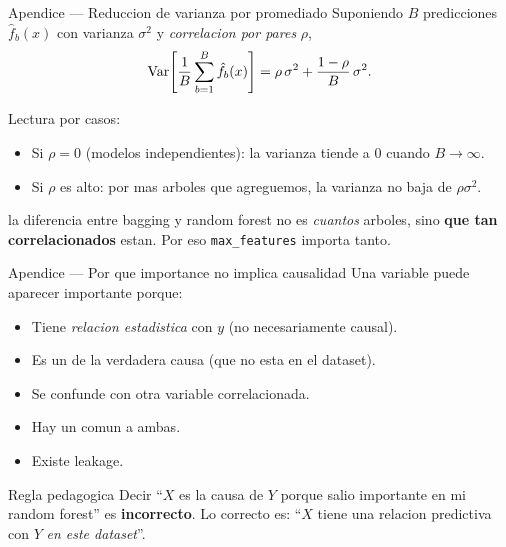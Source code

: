 \begin{frame}{Apendice — Reduccion de varianza por promediado}
Suponiendo $B$ predicciones $\hat f_b(x)$ con varianza $\sigma^2$ y \emph{correlacion por pares} $\rho$,
\[
\mathrm{Var}\!\left[\frac{1}{B}\sum_{b=1}^{B}\hat f_b(x)\right]
= \rho\,\sigma^2 + \frac{1-\rho}{B}\,\sigma^2.
\]

\vspace{0.3em}
Lectura por casos:
\begin{itemize}\small
  \item Si $\rho = 0$ (modelos independientes): la varianza tiende a $0$ cuando $B\to\infty$.
  \item Si $\rho$ es alto: por mas arboles que agreguemos, la varianza no baja de $\rho\sigma^2$.
\end{itemize}

\vspace{0.3em}
 la diferencia entre bagging y random forest no es \emph{cuantos} arboles, sino \textbf{que tan correlacionados} estan. Por eso \texttt{max\_features} importa tanto.
\end{frame}

\begin{frame}{Apendice — Por que importance no implica causalidad}
Una variable puede aparecer importante porque:
\begin{itemize}\small
  \item Tiene \emph{relacion estadistica} con $y$ (no necesariamente causal).
  \item Es un  de la verdadera causa (que no esta en el dataset).
  \item Se confunde con otra variable correlacionada.
  \item Hay un  comun a ambas.
  \item Existe leakage.
\end{itemize}

\vspace{0.4em}
\begin{block}{Regla pedagogica}
\small
Decir ``$X$ es la causa de $Y$ porque salio importante en mi random forest'' es \textbf{incorrecto}. Lo correcto es: ``$X$ tiene una relacion predictiva con $Y$ \emph{en este dataset}''.
\end{block}
\end{frame}

